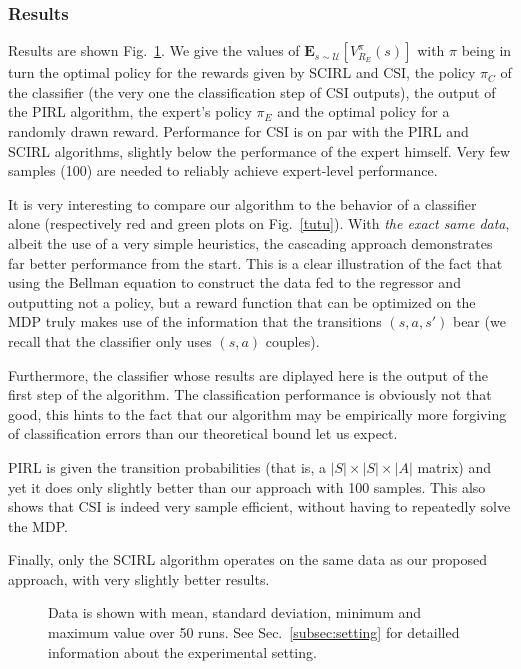 \documentclass[smallextended]{svjour3}
\begin{document}
\subsubsection{Results}
\label{subsubsec:hresults}
Results are shown Fig.~\ref{fig:Highway}. We give the values of $\mathbf{E}_{s\sim\mathcal{U}}[V^{\pi}_{R_E}(s)]$ with $\pi$ being in turn the optimal policy for the rewards given by SCIRL and CSI, the policy $\pi_C$ of the classifier (the very one the classification step of CSI outputs), the output of the PIRL algorithm, the expert's policy $\pi_E$ and the optimal policy for a randomly drawn reward. Performance for CSI is on par with the PIRL and SCIRL algorithms, slightly below the performance of the expert himself. Very few samples (100) are needed to reliably achieve expert-level performance.

It is very interesting to compare our algorithm to the behavior of a classifier alone (respectively red and green plots on Fig.~\ref{tutu}). With \emph{the exact same data}, albeit the use of a very simple heuristics, the cascading approach demonstrates far better performance from the start. This is a clear illustration of the fact that using the Bellman equation to construct the data fed to the regressor and outputting not a policy, but a reward function that can be optimized on the MDP truly makes use of the information that the transitions $(s,a,s')$ bear (we recall that the classifier only uses $(s,a)$ couples).

Furthermore, the classifier whose results are diplayed here is the output of the first step of the algorithm. The classification performance is obviously not that good, this hints to the fact that our algorithm may be empirically more forgiving of classification errors than our theoretical bound let us expect.

PIRL is given the transition probabilities (that is, a $|S|\times |S|\times |A|$ matrix) and yet it does only slightly better than our approach with 100 samples. This also shows that CSI is indeed very sample efficient, without having to repeatedly solve the MDP.

Finally, only the SCIRL algorithm operates on the same data as our proposed approach, with very slightly better results.

\begin{figure}

  \caption{Data is shown with mean, standard deviation, minimum and maximum value over 50 runs. See Sec.~\ref{subsec:setting} for detailled information about the experimental setting.}
  \label{fig:Highway}
\end{figure}
\end{document}
